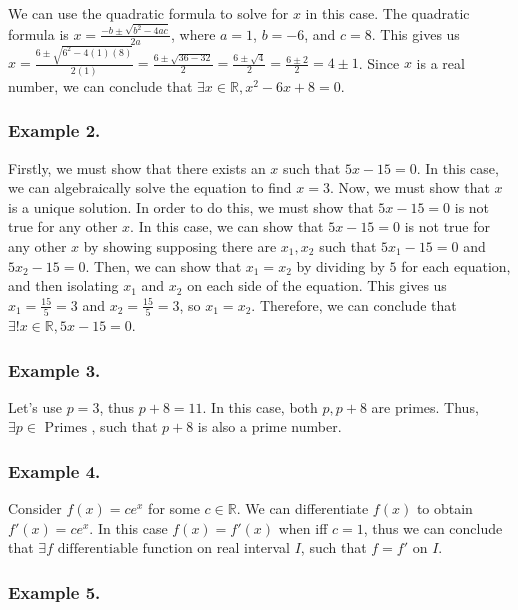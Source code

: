 \documentclass{article}
\begin{document}
We can use the quadratic formula to solve for $x$ in this case. The quadratic formula is $x = \frac{-b \pm \sqrt{b^2-4ac}}{2a}$, where $a = 1$, $b = -6$, and $c = 8$. This gives us $x = \frac{6 \pm \sqrt{6^2-4(1)(8)}}{2(1)} = \frac{6 \pm \sqrt{36-32}}{2} = \frac{6 \pm \sqrt{4}}{2} = \frac{6 \pm 2}{2} = 4 \pm 1$. Since $x$ is a real number, we can conclude that $\exists x \in \mathbb{R}, x^2-6x+8=0$.

\subsubsection*{Example 2.}

Firstly, we must show that there exists an $x$ such that $5x-15=0$. In this case, we can algebraically solve the equation to find $x=3$. Now, we must show that $x$ is a unique solution. In order to do this, we must show that $5x-15=0$ is not true for any other $x$. In this case, we can show that $5x-15=0$ is not true for any other $x$ by showing supposing there are $x_1, x_2$ such that $5x_1-15=0$ and $5x_2-15=0$. Then, we can show that $x_1=x_2$ by dividing by $5$ for each equation, and then isolating $x_1$ and $x_2$ on each side of the equation. This gives us $x_1 = \frac{15}{5} = 3$ and $x_2 = \frac{15}{5} = 3$, so $x_1=x_2$. Therefore, we can conclude that $\exists! x \in \mathbb{R}, 5x-15=0$. 

\subsubsection*{Example 3.}

Let's use $p = 3$, thus $p + 8 = 11$. In this case, both $p, p+8$ are primes. Thus, $\exists p \in \text{ Primes }$, such that $p+8$ is also a prime number.

\subsubsection*{Example 4.}

Consider $f(x)=ce^x$ for some $c \in \mathbb{R}$. We can differentiate $f(x)$ to obtain $f'(x)=ce^x$. In this case $f(x)=f'(x)$ when iff $c=1$, thus we can conclude that $\exists f \text{ differentiable function}$ on real interval $I$, such that $f = f'$ on $I$. 

\subsubsection*{Example 5.}
\end{document}
